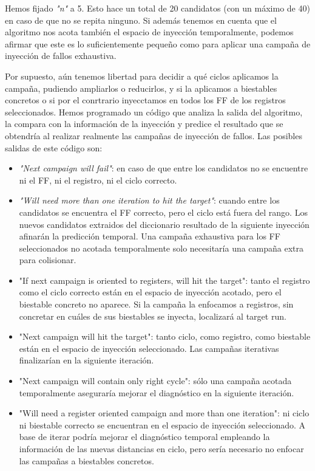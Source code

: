 Hemos fijado \textit{"n"} a 5. Esto hace un total de 20 candidatos (con un máximo
de 40) en caso de que no se repita ninguno. Si además tenemos en cuenta que el
algoritmo nos acota también el espacio de inyección temporalmente, podemos afirmar
que este es lo suficientemente pequeño como para aplicar una campaña de inyección
de fallos exhaustiva.

Por supuesto, aún tenemos libertad para decidir a qué ciclos aplicamos la campaña,
pudiendo ampliarlos o reducirlos, y si la aplicamos a biestables concretos o si 
por el conrtrario inyecctamos en todos los \gls{FF} de los registros
seleccionados. Hemos programado un código que analiza la salida del algoritmo, la
compara con la información de la inyección y predice el resultado que se obtendría
al realizar realmente las campañas de inyección de fallos. Las posibles salidas de
este código son:
\begin{itemize}
    \item \textit{"Next campaign will fail"}: en caso de que entre los candidatos 
        no se encuentre ni el \gls{FF}, ni el registro, ni el ciclo correcto.
    \item \textit{"Will need more than one iteration to hit the target"}: cuando
        entre los candidatos se encuentra el \gls{FF} correcto, pero el ciclo está
        fuera del rango. Los nuevos candidatos extraidos del diccionario resultado
        de la siguiente inyección afinarán la predicción temporal. Una campaña
        exhaustiva para los \gls{FF} seleccionados no acotada temporalmente solo
        necesitaría una campaña extra para colisionar.
    \item "If next campaign is oriented to registers, will hit the target": tanto
        el registro como el ciclo correcto están en el espacio de inyección
        acotado, pero el biestable concreto no aparece. Si la campaña la enfocamos
        a registros, sin concretar en cuáles de sus biestables se inyecta,
        localizará al target run.
    \item "Next campaign will hit the target": tanto ciclo, como registro, como
        biestable están en el espacio de inyección seleccionado. Las campañas
        iterativas finalizarían en la siguiente iteración.
    \item "Next campaign will contain only right cycle": sólo una campaña acotada
        temporalmente aseguraría mejorar el diagnóstico en la siguiente iteración.
    \item "Will need a register oriented campaign and more than one iteration": ni
        ciclo ni biestable correcto se encuentran en el espacio de inyección
        seleccionado. A base de iterar podría mejorar el diagnóstico temporal
        empleando la información de las nuevas distancias en ciclo, pero sería
        necesario no enfocar las campañas a biestables concretos.
\end{itemize}

